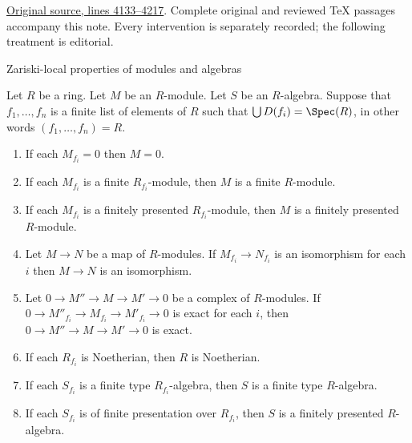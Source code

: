 \noindent\href{https://github.com/stacks/stacks-project/blob/a04446e57ec1fbc252a871afcec7752fb2807b14/algebra.tex\#L4133}{Original source, lines 4133--4217}. Complete original and reviewed TeX passages accompany this note. Every intervention is separately recorded; the following treatment is editorial.


\begin{lemma}
\label{editorial-source-lemma-cover}
\begin{slogan}
Zariski-local properties of modules and algebras
\end{slogan}
Let $R$ be a ring. Let $M$ be an $R$-module. Let $S$ be an $R$-algebra.
Suppose that $f_1, \ldots, f_n$ is a finite list of
elements of $R$ such that $\bigcup D(f_i) = \Spec(R)$,
in other words $(f_1, \ldots, f_n) = R$.
\begin{enumerate}
\item If each $M_{f_i} = 0$ then $M = 0$.
\item If each $M_{f_i}$ is a finite $R_{f_i}$-module,
then $M$ is a finite $R$-module.
\item If each $M_{f_i}$ is a finitely presented $R_{f_i}$-module,
then $M$ is a finitely presented $R$-module.
\item Let $M \to N$ be a map of $R$-modules. If $M_{f_i} \to N_{f_i}$
is an isomorphism for each $i$ then $M \to N$ is an isomorphism.
\item Let $0 \to M'' \to M \to M' \to 0$ be a complex of $R$-modules.
If $0 \to M''_{f_i} \to M_{f_i} \to M'_{f_i} \to 0$ is exact for each $i$,
then $0 \to M'' \to M \to M' \to 0$ is exact.
\item If each $R_{f_i}$ is Noetherian, then $R$ is Noetherian.
\item If each $S_{f_i}$ is a finite type $R_{f_i}$-algebra, then
$S$ is a finite type $R$-algebra.
\item If each $S_{f_i}$ is of finite presentation over $R_{f_i}$, then
$S$ is a finitely presented $R$-algebra.
\end{enumerate}
\end{lemma}

